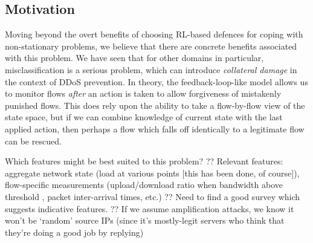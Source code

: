 \documentclass[conference, letterpaper, 10pt, times]{IEEEtran}
\begin{document}
\subsection{Motivation}
Moving beyond the overt benefits of choosing RL-based defences for coping with non-stationary problems, we believe that there are concrete benefits associated with this problem.
We have seen that for other domains in particular, misclassification is a serious problem, which can introduce \emph{collateral damage} in the context of DDoS prevention.
In theory, the feedback-loop-like model allows us to monitor flows \emph{after} an action is taken to allow forgiveness of mistakenly punished flows.
This does rely upon the ability to take a flow-by-flow view of the state space, but if we can combine knowledge of current state with the last applied action, then perhaps a flow which falls off identically to a legitimate flow can be rescued.

Which features might be best suited to this problem?
?? Relevant features: aggregate network state (load at various points [this has been done, of course]), flow-specific measurements (upload/download ratio when bandwidth above threshold \cite{DBLP:conf/ndss/Rossow14}, packet inter-arrival times, etc.)
?? Need to find a good survey which suggests indicative features.
?? If we assume amplification attacks, we know it won't be `random' source IPs (since it's mostly-legit servers who think that they're doing a good job by replying)
\end{document}
